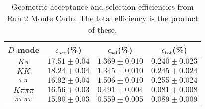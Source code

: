 \begin{table}[H]
    \centering
    \begin{tabular}{cccc}
        \toprule
        $D$ mode & $\epsilon_\mathrm{acc}$(\%) &  $\epsilon_\mathrm{sel}$(\%) &  $\epsilon_\mathrm{tot}$(\%) \\
        \midrule
        $K\pi$ & $17.51 \pm 0.04$ & $1.369 \pm 0.010$ & $0.240 \pm 0.023$ \\
        $KK$ & $18.24 \pm 0.04$ & $1.345 \pm 0.010$ & $0.245 \pm 0.024$ \\
        $\pi\pi$ & $16.92 \pm 0.04$ & $1.506 \pm 0.010$ & $0.255 \pm 0.024$ \\
        $K\pi\pi\pi$ & $16.56 \pm 0.03$ & $0.491 \pm 0.004$ & $0.081 \pm 0.008$ \\
        $\pi\pi\pi\pi$ & $15.90 \pm 0.03$ & $0.559 \pm 0.005$ & $0.089 \pm 0.009$ \\
        \bottomrule
    \end{tabular}
    \caption{Geometric acceptance and selection efficiencies from  Run 2 Monte Carlo. The total efficiency is the  product of these.}
\label{tab:selection_efficiency_run2}
\end{table}

